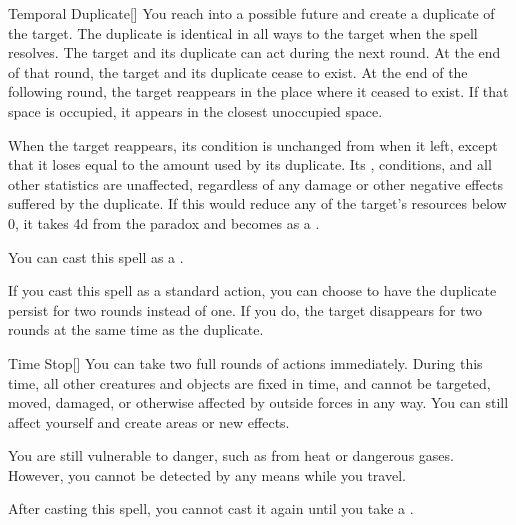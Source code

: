 \lowercase{\hypertarget{spell:Temporal Duplicate}{}}\label{spell:Temporal Duplicate}
\begin{freeability}[Rank 5]{\hypertarget{spell:Temporal Duplicate}{Temporal Duplicate}}[]
You reach into a possible future and create a duplicate of the target.
The duplicate is identical in all ways to the target when the spell resolves.
The target and its duplicate can act during the next round.
At the end of that round, the target and its duplicate cease to exist.
At the end of the following round, the target reappears in the place where it ceased to exist.
If that space is occupied, it appears in the closest unoccupied space.

When the target reappears, its condition is unchanged from when it left, except that it loses  equal to the amount used by its duplicate.
Its , conditions, and all other statistics are unaffected, regardless of any damage or other negative effects suffered by the duplicate.
If this would reduce any of the target's resources below 0, it takes  \plus4d from the paradox and becomes  as a .

You can cast this spell as a .

\rankline
{} If you cast this spell as a standard action, you can choose to have the duplicate persist for two rounds instead of one.
If you do, the target disappears for two rounds at the same time as the duplicate.
\end{freeability}
\vspace{0.25em}



\lowercase{\hypertarget{spell:Time Stop}{}}\label{spell:Time Stop}
\begin{freeability}[Rank 8]{\hypertarget{spell:Time Stop}{Time Stop}}[]
You can take two full rounds of actions immediately.
During this time, all other creatures and objects are fixed in time, and cannot be targeted, moved, damaged, or otherwise affected by outside forces in any way.
You can still affect yourself and create areas or new effects.

You are still vulnerable to danger, such as from heat or dangerous gases.
However, you cannot be detected by any means while you travel.

After casting this spell, you cannot cast it again until you take a .
\end{freeability}
\vspace{0.25em}



